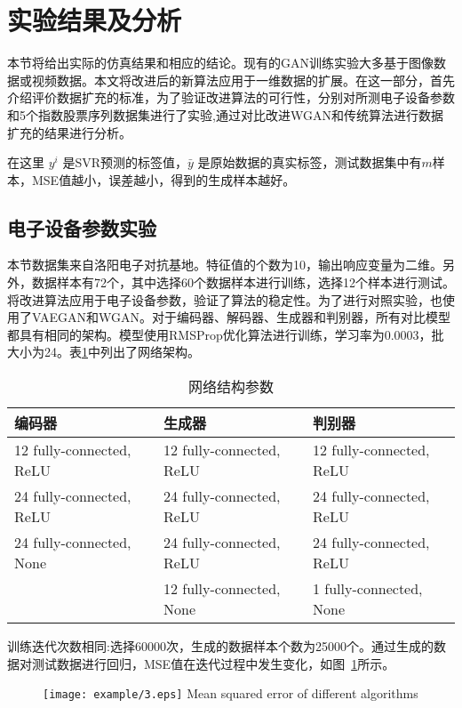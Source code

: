 \section{实验结果及分析}
本节将给出实际的仿真结果和相应的结论。现有的GAN训练实验大多基于图像数据或视频数据。本文将改进后的新算法应用于一维数据的扩展。在这一部分，首先介绍评价数据扩充的标准，为了验证改进算法的可行性，分别对所测电子设备参数和5个指数股票序列数据集进行了实验,通过对比改进WGAN和传统算法进行数据扩充的结果进行分析。


在这里 $y^{i}$ 是SVR预测的标签值，$\bar{y}$ 是原始数据的真实标签，测试数据集中有$m$样本，MSE值越小，误差越小，得到的生成样本越好。

\subsection{电子设备参数实验}

本节数据集来自洛阳电子对抗基地。特征值的个数为10，输出响应变量为二维。另外，数据样本有72个，其中选择60个数据样本进行训练，选择12个样本进行测试。将改进算法应用于电子设备参数，验证了算法的稳定性。为了进行对照实验，也使用了VAEGAN和WGAN。对于编码器、解码器、生成器和判别器，所有对比模型都具有相同的架构。模型使用RMSProp优化算法进行训练，学习率为0.0003，批大小为24。表\ref{tab3}中列出了网络架构。

\begin{table}[hpb]
	\centering
	\caption{网络结构参数}
	\label{tab3}
	\begin{tabular}{lll} \toprule
		编码器   & 生成器 & 判别器  \\  \midrule
		12 fully-connected, ReLU &12 fully-connected, ReLU&12 fully-connected, ReLU\\
		24 fully-connected, ReLU&24 fully-connected, ReLU&24 fully-connected, ReLU\\
		24 fully-connected, None&24 fully-connected, ReLU&24 fully-connected, ReLU\\
		&12 fully-connected, None&1 fully-connected, None\\ \bottomrule
	\end{tabular}
\end{table}

训练迭代次数相同:选择60000次，生成的数据样本个数为25000个。通过生成的数据对测试数据进行回归，MSE值在迭代过程中发生变化，如图~\ref{fig3}所示。

\begin{figure}[htpb]
	\centering
	\texttt{[image: example/3.eps]}
	{Mean squared error of different algorithms}
	\label{fig3}
\end{figure}

